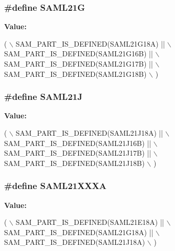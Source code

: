 \subsubsection[{S\+A\+M\+L21\+G}]{\setlength{\rightskip}{0pt plus 5cm}\#define S\+A\+M\+L21\+G}\label{group__sam__part__macros__group_ga81494be96e002472b9a552c8cf261db0}
{\bfseries Value\+:}
\begin{DoxyCode}
( \(\backslash\)
        SAM\_PART\_IS\_DEFINED(SAML21G18A) || \(\backslash\)
        SAM\_PART\_IS\_DEFINED(SAML21G16B) || \(\backslash\)
        SAM\_PART\_IS\_DEFINED(SAML21G17B) || \(\backslash\)
        SAM\_PART\_IS\_DEFINED(SAML21G18B) \(\backslash\)
    )
\end{DoxyCode}
\hypertarget{group__sam__part__macros__group_gab33eded948f0cd289b45cf2570ace7e1}{}
\subsubsection[{S\+A\+M\+L21\+J}]{\setlength{\rightskip}{0pt plus 5cm}\#define S\+A\+M\+L21\+J}\label{group__sam__part__macros__group_gab33eded948f0cd289b45cf2570ace7e1}
{\bfseries Value\+:}
\begin{DoxyCode}
( \(\backslash\)
        SAM\_PART\_IS\_DEFINED(SAML21J18A) || \(\backslash\)
        SAM\_PART\_IS\_DEFINED(SAML21J16B) || \(\backslash\)
        SAM\_PART\_IS\_DEFINED(SAML21J17B) || \(\backslash\)
        SAM\_PART\_IS\_DEFINED(SAML21J18B) \(\backslash\)
    )
\end{DoxyCode}
\hypertarget{group__sam__part__macros__group_ga133675be48c6539ee10945bd9577a99e}{}
\subsubsection[{S\+A\+M\+L21\+X\+X\+X\+A}]{\setlength{\rightskip}{0pt plus 5cm}\#define S\+A\+M\+L21\+X\+X\+X\+A}\label{group__sam__part__macros__group_ga133675be48c6539ee10945bd9577a99e}
{\bfseries Value\+:}
\begin{DoxyCode}
( \(\backslash\)
        SAM\_PART\_IS\_DEFINED(SAML21E18A) || \(\backslash\)
        SAM\_PART\_IS\_DEFINED(SAML21G18A) || \(\backslash\)
        SAM\_PART\_IS\_DEFINED(SAML21J18A) \(\backslash\)
    )
\end{DoxyCode}
\hypertarget{group__sam__part__macros__group_ga8f1ce40088d4f4a65fe4e9c9f6785043}{}
